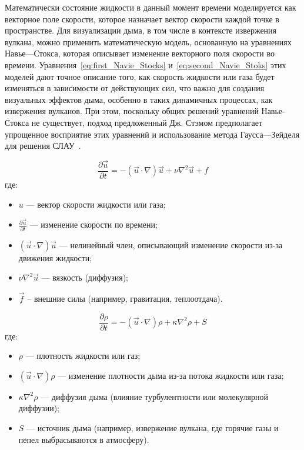 Математически состояние жидкости в данный момент времени моделируется как векторное поле скорости, которое назначает вектор скорости каждой точке в пространстве. Для визуализации дыма, в том числе в контексте извержения вулкана, можно применить математическую модель, основанную на уравнениях Навье---Стокса, которая описывает изменение векторного поля скорости во времени. Уравнения~\ref{eq:first_Navie_Stocks} и~\ref{eq:second_Navie_Stoks} этих моделей дают точное описание того, как скорость жидкости или газа будет изменяться в зависимости от действующих сил, что важно для создания визуальных эффектов дыма, особенно в таких динамичных процессах, как извержения вулканов. При этом, поскольку общих решений уравнений Навье-Стокса не существует, подход предложенный Дж. Стэмом предполагает упрощенное восприятие этих уравнений и использование метода Гаусса---Зейделя для решения СЛАУ~\cite{lit3, stam, Gauss}.

\begin{equation}
	\label{eq:first_Navie_Stocks}
	\frac{\partial \vec{u}}{\partial t} = - (\vec{u} \cdot \nabla) \vec{u} + \nu \nabla^2 \vec{u} + f
\end{equation}
где:
\begin{itemize}
	\item $u$ --- вектор скорости жидкости или газа;
	\item $\frac{\partial \vec{u}}{\partial t}$ --- изменение скорости по времени;
	\item $(\vec{u} \cdot \nabla) \vec{u}$ --- нелинейный член, описывающий изменение скорости из-за движения жидкости;
	\item \(\nu \nabla^2 \vec{u}\) --- вязкость (диффузия);
	\item \(\vec{f}\) -- внешние силы (например, гравитация, теплоотдача).
\end{itemize}

\begin{equation}
	\label{eq:second_Navie_Stoks}
	\frac{\partial \rho}{\partial t} = -(\vec{u} \cdot \nabla) \rho + \kappa \nabla^2 \rho + S
\end{equation}
где:
\begin{itemize}
	\item \(\rho\) --- плотность жидкости или газ;
	\item \((\vec{u} \cdot \nabla) \rho\) --- изменение плотности дыма из-за потока жидкости или газа;
	\item \(\kappa \nabla^2 \rho\) --- диффузия дыма (влияние турбулентности или молекулярной диффузии);
	\item \(S\) --- источник дыма (например, извержение вулкана, где горячие газы и пепел выбрасываются в атмосферу).
\end{itemize}
	
